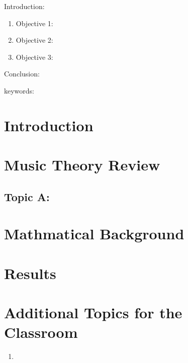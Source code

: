 


\twocolumn
\scriptsize
\begin{frontmatter}
		\title{}
		\author{}
		\address{The Mathematical Learning Space}
\end{frontmatter}	

Introduction:
\begin{enumerate}
\item Objective 1:
\item Objective 2:
\item Objective 3:
\end{enumerate}
Conclusion:

keywords:


\section{Introduction}


\section{Music Theory Review}

\subsection{Topic A:}

\section{Mathmatical Background}

\section{Results}


\section{Additional Topics for the Classroom}

\begin{enumerate}
\item 
\end{enumerate}




\begin{thebibliography}{00}

\end{thebibliography}


